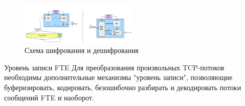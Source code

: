 \begin{figure}[h!]
    \begin{center}
        \includegraphics[width = 0.5\textwidth]{FTE_record_layer.png}
        \caption{Схема шифрования и дешифрования}
    \end{center}
\end{figure}

Уровень записи FTE
Для преобразования произвольных TCP-потоков необходимы дополнительные механизмы "уровень записи", позволяющие буферизировать, кодировать, безошибочно разбирать и декодировать потоки сообщений FTE и наоборот.

